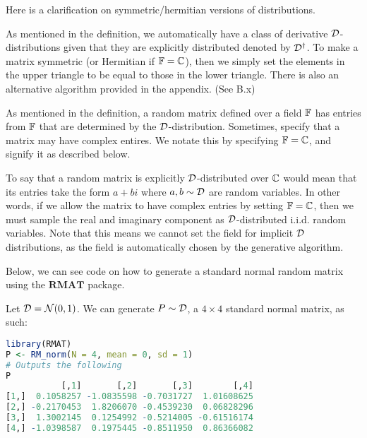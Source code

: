 Here is a clarification on symmetric/hermitian versions of distributions.

\begin{remark}
As mentioned in the definition, we automatically have a class of derivative $\mathcal{D}$-distributions given that they are explicitly distributed denoted by $\mathcal{D}^\dagger$. To make a matrix symmetric
(or Hermitian if $\mathbb{F} = \mathbb{C}$), then we simply set the elements in the upper triangle to be equal to those in the lower triangle. There is also an alternative algorithm provided in the appendix. (See B.x)
\end{remark}

As mentioned in the definition, a random matrix defined over a field $\mathbb{F}$ has entries from $\mathbb{F}$ that are determined by the $\mathcal{D}$-distribution.
Sometimes, specify that a matrix may have complex entires. We notate this by specifying $\mathbb{F} = \mathbb{C}$, and signify it as described below.

\begin{remark}
To say that a random matrix is explicitly $\mathcal{D}$-distributed over $\mathbb{C}$ would mean that its entries take the form $a + bi$ where $a,b \sim \mathcal{D}$ are random variables.
In other words, if we allow the matrix to have complex entries by setting $\mathbb{F} = \mathbb{C}$, then we must sample the real and imaginary component as $\mathcal{D}$-distributed i.i.d. random variables.
Note that this means we cannot set the field for implicit $\mathcal{D}$ distributions, as the field is automatically chosen by the generative algorithm.
\end{remark}

\medskip
\noindent Below, we can see code on how to generate a standard normal random matrix using the $\textbf{RMAT}$ package.
\begin{code}
Let $\mathcal{D} = \mathcal{N}(0,1)$. We can generate $P \sim \mathcal{D}$, a $4 \times 4$ standard normal matrix, as such:
\end{code}

\begin{lstlisting}[language=R]
library(RMAT)
P <- RM_norm(N = 4, mean = 0, sd = 1)
# Outputs the following
P
           [,1]       [,2]       [,3]        [,4]
[1,]  0.1058257 -1.0835598 -0.7031727  1.01608625
[2,] -0.2170453  1.8206070 -0.4539230  0.06828296
[3,]  1.3002145  0.1254992 -0.5214005 -0.61516174
[4,] -1.0398587  0.1975445 -0.8511950  0.86366082
\end{lstlisting}


\newpage

